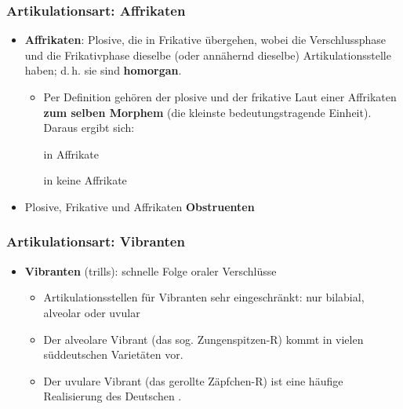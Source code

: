 \begin{frame}
\frametitle{Artikulationsart: Affrikaten}

		\begin{itemize}
			\item \textbf{Affrikaten}: Plosive, die in Frikative übergehen, wobei die Verschlussphase und die Frikativphase dieselbe (oder annähernd dieselbe) Artikulationsstelle haben; d.\,h. sie sind \textbf{homorgan}.

			\ea {} %
			\z

			\begin{itemize}
				\item Per Definition gehören der plosive und der frikative Laut einer Affrikaten \textbf{zum selben Morphem} (die kleinste bedeutungstragende Einheit). Daraus ergibt sich:

				\ea \textipa{[ \t{ts} ]} in  \ras Affrikate
				\z
				
				\ea \textipa{[ ts ]} in  \ras keine Affrikate
				\z

			\end{itemize}
		
		
		\item Plosive, Frikative und Affrikaten \ras \textbf{Obstruenten}
	\end{itemize}
	
\end{frame}


\begin{frame}
\frametitle{Artikulationsart: Vibranten}

		\begin{itemize}
			\item \textbf{Vibranten} (trills): schnelle Folge oraler Verschlüsse
			\begin{itemize}
				
				\item Artikulationsstellen für Vibranten sehr eingeschränkt: nur bilabial, alveolar oder uvular
				
				\item Der alveolare Vibrant \textipa{[ r ]} (das sog. Zungenspitzen-R) kommt in vielen süddeutschen Varietäten vor.
				
				\item Der uvulare Vibrant \textipa{[ \textscr\ ]} (das gerollte Zäpfchen-R) ist eine häufige Realisierung des Deutschen .
			\end{itemize}
			 
	\end{itemize}
	
\end{frame}


